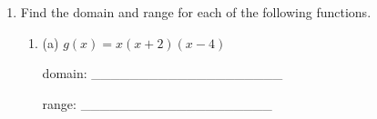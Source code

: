 \documentclass[11pt]{article}
\begin{document}
\begin{enumerate}
{{\[\begin{aligned} & \left[\begin{array}{cc|c} -4 & 14 & 126 \\ 1 & -3 & -27 \end{array}\right] \\ \xrightarrow{R_1 \leftrightarrow R_2} & \left[\begin{array}{cc|c} 1 & -3 & -27 \\ -4 & 14 & 126 \end{array}\right] \\ \xrightarrow{R_2 + 4R_1 \to R_2} & \left[\begin{array}{cc|c} 1 & -3 & -27 \\ 0 & 2 & 18 \end{array}\right] \\ \xrightarrow{\frac{R_2}{2} \to R_2} & \left[\begin{array}{cc|c} 1 & -3 & -27 \\ 0 & 1 & 9 \end{array}\right] \\ \xrightarrow{R_1 + 3R_2 \to R_1} & \left[\begin{array}{cc|c} 1 & 0 & 0 \\ 0 & 1 & 9 \end{array}\right] \end{aligned}\]

\(\boxed{ (0, 9) }\)

}
}

\newpage

% 

\item %
\providecommand{\stxKnowl}{}\renewcommand{\stxKnowl}[1]{#1}
\providecommand{\stxOuttro}{}\renewcommand{\stxOuttro}[1]{#1}
\providecommand{\stxTitle}{}\renewcommand{\stxTitle}[1]{#1}
\renewcommand{\stxOuttro}[1]{}
\stxKnowl{
Find the domain and range for each of the following functions.

\begin{enumerate}
\item
\stxKnowl{
(a) \(g(x) = x(x + 2)(x - 4)\)

domain: ____________________

range: ____________________

\stxOuttro{
Solution

\[\text{Domain: } (-\infty, \infty)\]

domain: \(\boxed{ (-\infty, \infty) }\)

}}
\end{enumerate}}
\end{enumerate}
\end{document}
